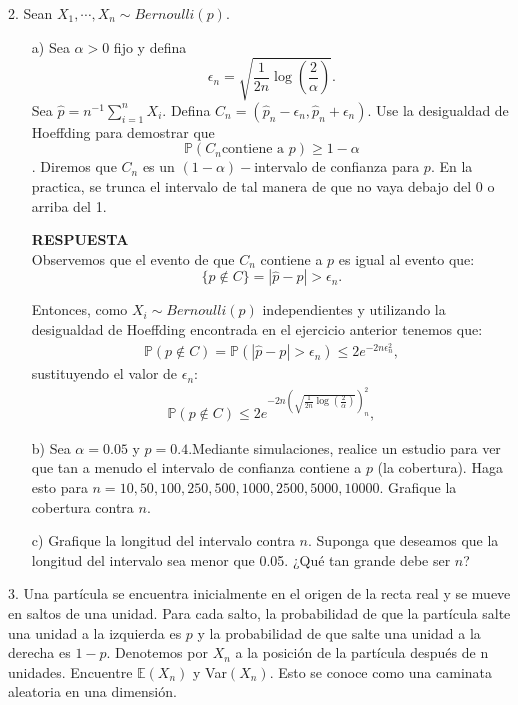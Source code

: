 \documentclass[11pt,letterpaper]{article}
\newcommand{\mP}{\mathbb{P}}
\newcommand{\mE}{\mathbb{E}}
\newcommand{\res}{\textbf{RESPUESTA}\\}
\begin{document}
2. Sean  $X_1,\cdots,X_n\sim Bernoulli(p)$.
\begin{itemize}
\item[a)] Sea $\alpha >0 $ fijo y defina 
$$\epsilon_n = \sqrt{\frac{1}{2n} \log\left(\frac{2}{\alpha}\right)}.$$
Sea $\hat{p}=n^{-1}\sum_{i=1}^n X_i.$ Defina $C_n=(\hat{p}_n-\epsilon_n,\hat{p}_n+\epsilon_n)$. Use la desigualdad de Hoeffding para demostrar que $$\mP(C_n \text{contiene a } p)\geq 1-\alpha$$.
Diremos que $C_n$ es un $(1-\alpha)-$intervalo de confianza para $p$. En la practica, se trunca el intervalo de tal manera de que no vaya debajo del 0 o arriba del 1.

\res Observemos que el evento de que $C_n$ contiene a $p$ es igual al evento que:
$$\{p \not \in C\}=|\hat{p}-p|>\epsilon_n.$$

Entonces, como $X_i\sim Bernoulli(p)$ independientes y utilizando la desigualdad de Hoeffding encontrada en el ejercicio anterior tenemos que:
\begin{align*}
\mP(p\not \in C)=\mP(|\hat{p}-p|>\epsilon_n)\leq 2e^{-2n\epsilon_n^2},
\end{align*}
sustituyendo el valor de $\epsilon_n$:
\begin{align*}
\mP(p\not \in C)\leq 2e^{-2n(\sqrt{\frac{1}{2n} \log\left(\frac{2}{\alpha}\right)})_n^2},
\end{align*}

\item[b)] Sea $\alpha=0.05$ y $p=0.4$.Mediante simulaciones, realice un estudio para ver que tan a menudo el intervalo de confianza contiene a $p$ (la cobertura). Haga esto para $n=
10, 50, 100, 250, 500, 1000, 2500, 5000, 10000$. Grafique la cobertura contra $n$.

\item[c)] Grafique la longitud del intervalo contra $n$. Suponga que deseamos que la longitud del intervalo sea menor que 0.05. ¿Qué tan grande debe ser $n$?
\end{itemize}

3. Una partícula se encuentra inicialmente en el origen de la recta real y se mueve en saltos de una unidad. Para cada salto, la probabilidad de que la partícula salte una unidad a la izquierda es $p$ y la probabilidad de que salte una unidad a la derecha es $1-p$. Denotemos por $X_n$ a la posición de la partícula después de n unidades. Encuentre $\mE(X_n)$ y Var$(X_n)$. Esto se conoce como una caminata aleatoria en una dimensión. \\
\end{document}

